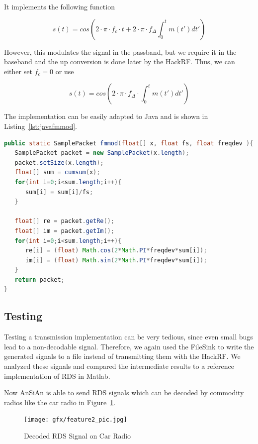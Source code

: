 It implements the following function 

\begin{equation}
 s(t) = cos\left(2\cdot \pi \cdot f_c \cdot t + 2\cdot \pi\cdot f_\Delta \int_{0}^{t}m(t')dt'\right)
\end{equation}

However, this modulates the signal in the passband, but we require it in the baseband and the up conversion is done later by the HackRF. Thus, we can either set $f_c=0$ or use 

\begin{equation}
s(t) = cos\left(2\cdot \pi \cdot f_\Delta  \cdot \int_{0}^{t}m(t')dt'\right)
\end{equation}


The implementation can be easily adapted to Java and is shown in Listing~\ref{lst:javafmmod}.
\begin{lstlisting}[label=lst:javafmmod, caption=Java Implementation of fmmod, language=java,]
public static SamplePacket fmmod(float[] x, float fs, float freqdev ){
   SamplePacket packet = new SamplePacket(x.length);
   packet.setSize(x.length);
   float[] sum = cumsum(x);
   for(int i=0;i<sum.length;i++){
      sum[i] = sum[i]/fs;
   }
	
   float[] re = packet.getRe();
   float[] im = packet.getIm();
   for(int i=0;i<sum.length;i++){
      re[i] = (float) Math.cos(2*Math.PI*freqdev*sum[i]);
      im[i] = (float) Math.sin(2*Math.PI*freqdev*sum[i]);
   }
   return packet;
}

\end{lstlisting}



\subsection{Testing} 
Testing a transmission implementation can be very tedious, since even small bugs lead to a non-decodable signal. Therefore, we again used the FileSink to write the generated signals to a file instead of transmitting them with the HackRF. We analyzed these signals and compared the intermediate results to a reference implementation of RDS in Matlab. 

Now AnSiAn is able to send RDS signals which can be decoded by commodity radios like the car radio in Figure~\ref{fig:impl:picrds}.

\begin{figure}
	\centering
	\texttt{[image: gfx/feature2\_pic.jpg]}
	\caption{Decoded RDS Signal on Car Radio}
	\label{fig:impl:picrds}
\end{figure}

